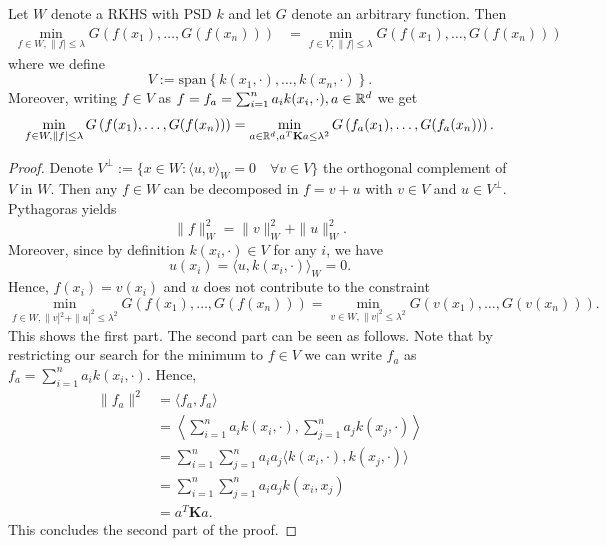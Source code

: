 \begin{theorem}\label{theo:representer}
Let $W$ denote a RKHS with PSD $k$ and let $G$ denote an arbitrary function. Then
\begin{align*}
	\min_{f\in W, \|f|\leq \lambda} G\left(f(x_1), \ldots, G(f(x_n))\right) &= \min_{f\in V, \|f|\leq \lambda} G\left(f(x_1), \ldots, G(f(x_n))\right)
\end{align*}
where we define
\begin{equation*}
	V := \mathrm{span}\left\{k(x_1, \cdot), \ldots, k(x_n, \cdot)\right\}.
\end{equation*}
Moreover, writing $f \in V$ as $f = f_a = \sum_{i=1}^n a_i k(x_i, \cdot), a \in \mathbb{R}^d$ we get
\begin{equation*}
	\min_{f\in W, \|f|\leq \lambda} G\left(f(x_1), \ldots, G(f(x_n))\right) = \min_{a\in \mathbb{R}^d, a^T\mathbf{K}a \leq \lambda^2} G\left(f_a(x_1), \ldots, G(f_a(x_n))\right).
\end{equation*}
\end{theorem}
\begin{proof}
Denote $V^\perp := \{x \in W : \langle u, v \rangle_W = 0 \quad \forall v \in V\}$ the orthogonal complement of $V$ in $W$. Then any $f\in W$ can be decomposed in $f = v + u$ with $v \in V$ and $u\in V^\perp$. Pythagoras yields
\begin{equation*}
	\|f\|_W^2 = \|v\|_W^2 + \|u\|_W^2.
\end{equation*}
Moreover, since by definition $k(x_i, \cdot) \in V$ for any $i$, we have
\begin{equation*}
	u(x_i) = \langle u, k(x_i, \cdot) \rangle_W = 0.
\end{equation*}
Hence, $f(x_i) = v(x_i)$ and $u$ does not contribute to the constraint
\begin{equation*}
	\min_{f\in W, \|v|^2+\|u|^2\leq \lambda^2} G\left(f(x_1), \ldots, G(f(x_n))\right) = \min_{v\in W, \|v|^2\leq \lambda^2} G\left(v(x_1), \ldots, G(v(x_n))\right).
\end{equation*}
This shows the first part. The second part can be seen as follows. Note that by restricting our search for the minimum to $f \in V$ we can write $f_a$ as $f_a = \sum_{i=1}^n a_i k(x_i, \cdot)$. Hence,
\begin{align*}
	\|f_a\|^2 &= \langle f_a, f_a \rangle \\
						&= \left\langle \sum_{i=1}^n a_i k(x_i, \cdot),\sum_{j=1}^n a_j k(x_j, \cdot)\right\rangle \\
						&= \sum_{i=1}^n\sum_{j=1}^n a_i a_j \langle k(x_i, \cdot),k(x_j, \cdot) \rangle \\
						&= \sum_{i=1}^n\sum_{j=1}^n a_i a_j k(x_i,x_j) \\
						&= a^T\mathbf{K}a.
\end{align*}
This concludes the second part of the proof.
\end{proof}


